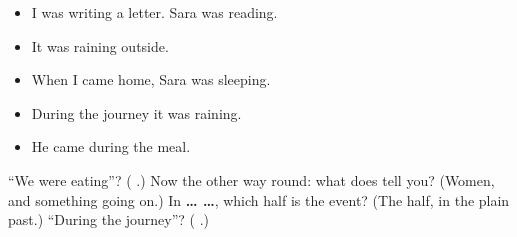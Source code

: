 \begin{itemize}
\raggedright
  \item I was writing a letter. Sara was reading.
  \item It was raining outside.
  \item When I came home, Sara was sleeping.
  \item During the journey it was raining.
  \item He came during the meal.
\end{itemize}

\begin{tcolorbox}[breakable,colback=teal!4,colframe=teal!35!black,title={Before you move on}]
\textquotedblleft{}We were eating\textquotedblright{}? (\textbf{   }.) Now the other way round: what does \textbf{ } tell you? (Women, and something going on.) In \textbf{ …  …}, which half is the event? (The \textbf{} half, in the plain past.) \textquotedblleft{}During the journey\textquotedblright{}? (\textbf{  }.)
\end{tcolorbox}
